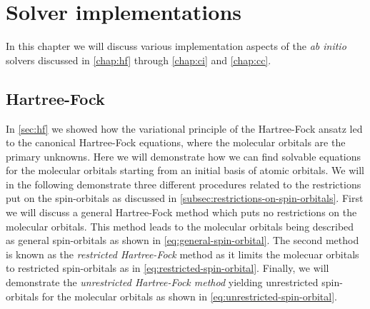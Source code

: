 \chapter{Solver implementations}
    In this chapter we will discuss various implementation aspects of the \emph{ab
    initio} solvers discussed in \autoref{chap:hf} through \autoref{chap:ci} and
    \autoref{chap:cc}.

    \section{Hartree-Fock}
        In \autoref{sec:hf} we showed how the variational principle of the
        Hartree-Fock ansatz led to the canonical Hartree-Fock equations, where
        the molecular orbitals are the primary unknowns.
        Here we will demonstrate how we can find solvable equations for the
        molecular orbitals starting from an initial basis of atomic orbitals.
        We will in the following demonstrate three different procedures related
        to the restrictions put on the spin-orbitals as discussed in
        \autoref{subsec:restrictions-on-spin-orbitals}.
        First we will discuss a general Hartree-Fock method which puts no
        restrictions on the molecular orbitals.
        This method leads to the molecular orbitals being described as general
        spin-orbitals as shown in \autoref{eq:general-spin-orbital}.
        The second method is known as the \emph{restricted Hartree-Fock} method
        as it limits the molecuar orbitals to restricted spin-orbitals as
        in \autoref{eq:restricted-spin-orbital}.
        Finally, we will demonstrate the \emph{unrestricted Hartree-Fock method}
        yielding unrestricted spin-orbitals for the molecular orbitals as
        shown in \autoref{eq:unrestricted-spin-orbital}.

